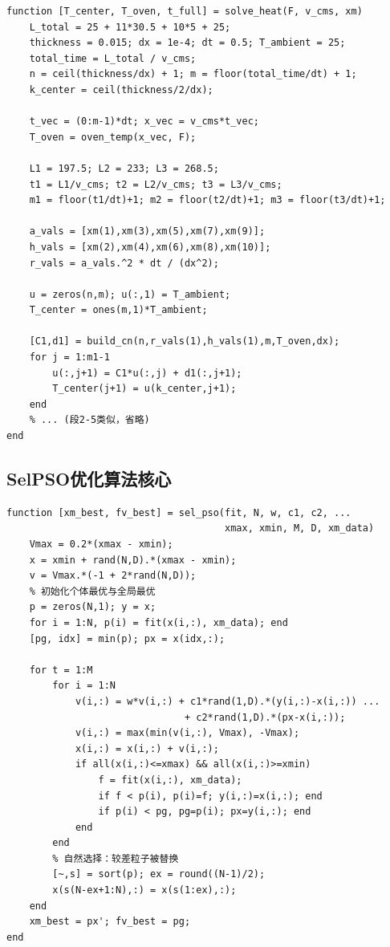 \documentclass[12pt,a4paper]{ctexart}
\begin{document}
\begin{lstlisting}
function [T_center, T_oven, t_full] = solve_heat(F, v_cms, xm)
    L_total = 25 + 11*30.5 + 10*5 + 25;
    thickness = 0.015; dx = 1e-4; dt = 0.5; T_ambient = 25;
    total_time = L_total / v_cms;
    n = ceil(thickness/dx) + 1; m = floor(total_time/dt) + 1;
    k_center = ceil(thickness/2/dx);

    t_vec = (0:m-1)*dt; x_vec = v_cms*t_vec;
    T_oven = oven_temp(x_vec, F);

    L1 = 197.5; L2 = 233; L3 = 268.5;
    t1 = L1/v_cms; t2 = L2/v_cms; t3 = L3/v_cms;
    m1 = floor(t1/dt)+1; m2 = floor(t2/dt)+1; m3 = floor(t3/dt)+1;

    a_vals = [xm(1),xm(3),xm(5),xm(7),xm(9)];
    h_vals = [xm(2),xm(4),xm(6),xm(8),xm(10)];
    r_vals = a_vals.^2 * dt / (dx^2);

    u = zeros(n,m); u(:,1) = T_ambient;
    T_center = ones(m,1)*T_ambient;

    [C1,d1] = build_cn(n,r_vals(1),h_vals(1),m,T_oven,dx);
    for j = 1:m1-1
        u(:,j+1) = C1*u(:,j) + d1(:,j+1);
        T_center(j+1) = u(k_center,j+1);
    end
    % ... (段2-5类似，省略)
end
\end{lstlisting}

\subsection*{SelPSO优化算法核心}

\begin{lstlisting}
function [xm_best, fv_best] = sel_pso(fit, N, w, c1, c2, ...
                                      xmax, xmin, M, D, xm_data)
    Vmax = 0.2*(xmax - xmin);
    x = xmin + rand(N,D).*(xmax - xmin);
    v = Vmax.*(-1 + 2*rand(N,D));
    % 初始化个体最优与全局最优
    p = zeros(N,1); y = x;
    for i = 1:N, p(i) = fit(x(i,:), xm_data); end
    [pg, idx] = min(p); px = x(idx,:);

    for t = 1:M
        for i = 1:N
            v(i,:) = w*v(i,:) + c1*rand(1,D).*(y(i,:)-x(i,:)) ...
                               + c2*rand(1,D).*(px-x(i,:));
            v(i,:) = max(min(v(i,:), Vmax), -Vmax);
            x(i,:) = x(i,:) + v(i,:);
            if all(x(i,:)<=xmax) && all(x(i,:)>=xmin)
                f = fit(x(i,:), xm_data);
                if f < p(i), p(i)=f; y(i,:)=x(i,:); end
                if p(i) < pg, pg=p(i); px=y(i,:); end
            end
        end
        % 自然选择：较差粒子被替换
        [~,s] = sort(p); ex = round((N-1)/2);
        x(s(N-ex+1:N),:) = x(s(1:ex),:);
    end
    xm_best = px'; fv_best = pg;
end
\end{lstlisting}
\end{document}

